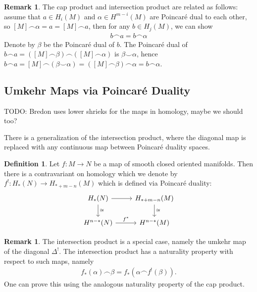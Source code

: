 \documentclass{scrartcl}
\let\emph\relax
\newcommand{\emphi}[1]{\index{#1}\emph{#1}}
\theoremstyle{plain}
\theoremstyle{definition}
\newtheorem{definition}[theorem]{Definition}
\newtheorem{remark}[theorem]{Remark}
\newcommand{\capp}{\mathbin{\frown}}
\newcommand{\cupp}{\mathbin{\smile}}
\newcommand{\iso}{\cong}
\begin{document}
\begin{remark}
The cap product and intersection product are related as follows: assume that $a\in H_i(M)$ and $\alpha\in H^{m-i}(M)$ are Poincaré dual to each other, so $[M]\capp \alpha = a = [M]\capp a$, then for any $b\in H_j(M)$, we can show 
\begin{align*}
    b\capp a = b\capp \alpha 
\end{align*}
Denote by $\beta$ be the Poincaré dual of $b$. The Poincaré dual of  $b\capp a = ([M]\capp \beta) \capp ([M] \capp\alpha)$ is $\beta\cupp\alpha$, hence $b\capp a = [M] \capp (\beta\cupp \alpha) = ([M]\capp \beta) \capp \alpha =  b\capp \alpha$.
\end{remark}

\subsection{Umkehr Maps via Poincaré Duality} \label{subsubsec:umkehr_maps_via_pd}
TODO: Bredon uses lower shrieks for the maps in homology, maybe we should too? 

There is a generalization of the intersection product, where the diagonal map is replaced with any continuous map between Poincaré duality spaces. 

\begin{definition}
Let $f\colon M\to  N$ be a map of smooth closed oriented manifolds. Then there is a contravariant \emphi{umkehr map} on homology which we denote by $f^!\colon H_*(N)\to H_{*+m-n}(M)$ which is defined via Poincaré duality:
\begin{equation}
    \begin{tikzcd}
        H_*(N) \dar["\iso"] \rar & H_{*+m-n}(M) \dar["\iso"] \\
        H^{n-*}(N) \rar["f^*"] & H^{n-*}(M)
    \end{tikzcd}
\end{equation}
\end{definition}

\begin{remark}
The intersection product is a special case, namely the umkehr map of the diagonal $\Delta^!$. The intersection product has a naturality property with respect to such maps, namely
\begin{align*}
    f_*(\alpha) \capp \beta = f_*(\alpha \capp f^!(\beta)).
\end{align*}
One can prove this using the analogous naturality property of the cap product.
\end{remark}
\end{document}
